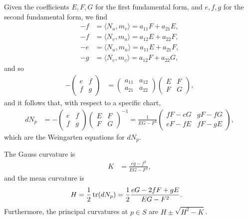 Given the coefficients $E, F, G$ for the first fundamental form, and $e, f, g$ for the second fundamental form, we find
\begin{align*}
    -f &= \langle N_u, m_v \rangle = a_{11}F + a_{21}E, \\
    -f &= \langle N_v, m_u \rangle = a_{12}E + a_{22}F, \\
    -e &= \langle N_u, m_u \rangle = a_{11}E + a_{21}F, \\
    -g &= \langle N_v, m_v \rangle = a_{12}F + a_{22}G,
\end{align*}
and so
\begin{align*}
    -\begin{pmatrix}
        e & f \\ f & g
    \end{pmatrix} &= \begin{pmatrix}
        a_{11} & a_{12} \\ a_{21} & a_{22}
    \end{pmatrix}\begin{pmatrix}
        E & F \\ F & G
    \end{pmatrix},
\end{align*}
and it follows that, with respect to a specific chart,
\begin{align*}
    dN_{p} &= -\begin{pmatrix}
        e & f \\ f & g
    \end{pmatrix}\begin{pmatrix}
        E & F \\ F & G
    \end{pmatrix}^{-1} = \frac{1}{EG - F^2}\begin{pmatrix}
        fF - eG & gF - fG\\
        eF - fE & fF - gE
    \end{pmatrix},
\end{align*}
which are the Weingarten equations for $dN_{p}$.

\begin{cor}
    The Gauss curvature is
    \begin{align*}
        K &= \frac{eg-f^2}{EG-F^2},
    \end{align*}
    and the mean curvature is
    \begin{align*}
        H &= \frac{1}{2}\operatorname{tr}(dN_p) = \frac{1}{2}\frac{eG-2fF+gE}{EG-F^2}.
    \end{align*}
    Furthermore, the principal curvatures at $p \in S$ are $H \pm \sqrt{H^2 - K}$.
\end{cor}

